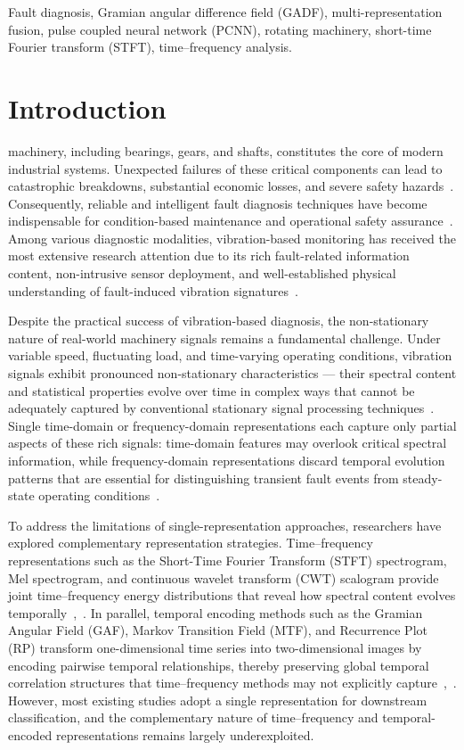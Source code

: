 \documentclass[journal]{IEEEtran}
\begin{document}
\begin{IEEEkeywords}
Fault diagnosis, Gramian angular difference field (GADF), multi-representation fusion, pulse coupled neural network (PCNN), rotating machinery, short-time Fourier transform (STFT), time--frequency analysis.
\end{IEEEkeywords}

\section{Introduction}
 machinery, including bearings, gears, and shafts, constitutes the core of modern industrial systems. Unexpected failures of these critical components can lead to catastrophic breakdowns, substantial economic losses, and severe safety hazards~\cite{alonso-gonzalezBearingFaultDiagnosis2023}. Consequently, reliable and intelligent fault diagnosis techniques have become indispensable for condition-based maintenance and operational safety assurance~\cite{7033433}. Among various diagnostic modalities, vibration-based monitoring has received the most extensive research attention due to its rich fault-related information content, non-intrusive sensor deployment, and well-established physical understanding of fault-induced vibration signatures~\cite{5352306}.

Despite the practical success of vibration-based diagnosis, the non-stationary nature of real-world machinery signals remains a fundamental challenge. Under variable speed, fluctuating load, and time-varying operating conditions, vibration signals exhibit pronounced non-stationary characteristics — their spectral content and statistical properties evolve over time in complex ways that cannot be adequately captured by conventional stationary signal processing techniques~\cite{4717246}. Single time-domain or frequency-domain representations each capture only partial aspects of these rich signals: time-domain features may overlook critical spectral information, while frequency-domain representations discard temporal evolution patterns that are essential for distinguishing transient fault events from steady-state operating conditions~\cite{zhangFaultDiagnosisRecognition2024}.

To address the limitations of single-representation approaches, researchers have explored complementary representation strategies. Time--frequency representations such as the Short-Time Fourier Transform (STFT) spectrogram, Mel spectrogram, and continuous wavelet transform (CWT) scalogram provide joint time--frequency energy distributions that reveal how spectral content evolves temporally~\cite{10091539},~\cite{9760386}. In parallel, temporal encoding methods such as the Gramian Angular Field (GAF), Markov Transition Field (MTF), and Recurrence Plot (RP) transform one-dimensional time series into two-dimensional images by encoding pairwise temporal relationships, thereby preserving global temporal correlation structures that time--frequency methods may not explicitly capture~\cite{11048665},~\cite{10114345}. However, most existing studies adopt a single representation for downstream classification, and the complementary nature of time--frequency and temporal-encoded representations remains largely underexploited.
\end{document}
